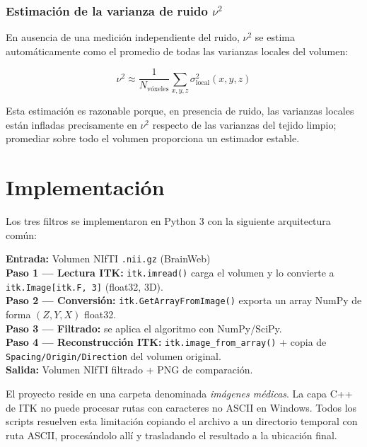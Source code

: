 \documentclass[12pt, a4paper]{article}
\begin{document}
\subsubsection{Estimación de la varianza de ruido $\nu^2$}

En ausencia de una medición independiente del ruido, $\nu^2$ se estima automáticamente
como el promedio de todas las varianzas locales del volumen:

\begin{equation}
  \nu^2 \approx \frac{1}{N_{\text{vóxeles}}} \sum_{x,y,z} \sigma^2_{\text{local}}(x,y,z)
  \label{eq:nu2}
\end{equation}

Esta estimación es razonable porque, en presencia de ruido, las varianzas locales están
infladas precisamente en $\nu^2$ respecto de las varianzas del tejido limpio; promediar
sobre todo el volumen proporciona un estimador estable.

\section{Implementación}

Los tres filtros se implementaron en Python 3 con la siguiente arquitectura común:

\begin{tcolorbox}[infostyle, title={Pipeline general (los tres filtros)}]
\textbf{Entrada:} Volumen NIfTI \texttt{.nii.gz} (BrainWeb) \\[0.3em]
\textbf{Paso 1 — Lectura ITK:} \texttt{itk.imread()} carga el volumen y lo convierte a
\texttt{itk.Image[itk.F, 3]} (float32, 3D).\\[0.3em]
\textbf{Paso 2 — Conversión:} \texttt{itk.GetArrayFromImage()} exporta un array NumPy
de forma $(Z, Y, X)$ float32.\\[0.3em]
\textbf{Paso 3 — Filtrado:} se aplica el algoritmo con NumPy/SciPy.\\[0.3em]
\textbf{Paso 4 — Reconstrucción ITK:} \texttt{itk.image\_from\_array()} + copia de
\texttt{Spacing/Origin/Direction} del volumen original.\\[0.3em]
\textbf{Salida:} Volumen NIfTI filtrado + PNG de comparación.
\end{tcolorbox}

\begin{tcolorbox}[warnstyle, title={Nota técnica — Rutas con caracteres no ASCII}]
El proyecto reside en una carpeta denominada \textit{imágenes médicas}. La capa C++ de
ITK no puede procesar rutas con caracteres no ASCII en Windows. Todos los scripts
resuelven esta limitación copiando el archivo a un directorio temporal con ruta ASCII,
procesándolo allí y trasladando el resultado a la ubicación final.
\end{tcolorbox}
\end{document}
